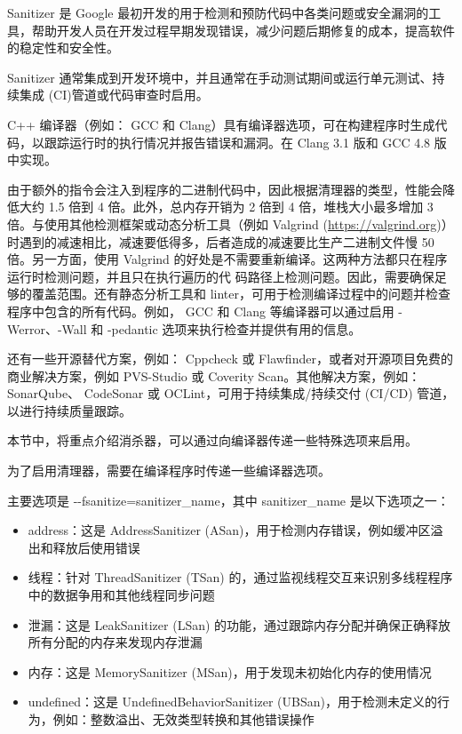 
Sanitizer 是 Google 最初开发的用于检测和预防代码中各类问题或安全漏洞的工具，帮助开发人员在开发过程早期发现错误，减少问题后期修复的成本，提高软件的稳定性和安全性。

Sanitizer 通常集成到开发环境中，并且通常在手动测试期间或运行单元测试、持续集成 (CI)管道或代码审查时启用。

C++ 编译器（例如： GCC 和 Clang）具有编译器选项，可在构建程序时生成代码，以跟踪运行时的执行情况并报告错误和漏洞。在 Clang 3.1 版和 GCC 4.8 版中实现。

由于额外的指令会注入到程序的二进制代码中，因此根据清理器的类型，性能会降低大约 1.5 倍到 4 倍。此外，总内存开销为 2 倍到 4 倍，堆栈大小最多增加 3 倍。与使用其他检测框架或动态分析工具（例如 Valgrind (\url{https://valgrind.org})）时遇到的减速相比，减速要低得多，后者造成的减速要比生产二进制文件慢 50 倍。另一方面，使用 Valgrind 的好处是不需要重新编译。这两种方法都只在程序运行时检测问题，并且只在执行遍历的代
码路径上检测问题。因此，需要确保足够的覆盖范围。还有静态分析工具和 linter，可用于检测编译过程中的问题并检查程序中包含的所有代码。例如， GCC 和 Clang 等编译器可以通过启用 -Werror、-Wall 和 -pedantic 选项来执行检查并提供有用的信息。

还有一些开源替代方案，例如： Cppcheck 或 Flawfinder，或者对开源项目免费的商业解决方案，例如 PVS-Studio 或 Coverity Scan。其他解决方案，例如： SonarQube、 CodeSonar 或 OCLint，可用于持续集成/持续交付 (CI/CD) 管道，以进行持续质量跟踪。

本节中，将重点介绍消杀器，可以通过向编译器传递一些特殊选项来启用。


为了启用清理器，需要在编译程序时传递一些编译器选项。

主要选项是 -{}-fsanitize=sanitizer\_name，其中 sanitizer\_name 是以下选项之一：

\begin{itemize}
\item
address：这是 AddressSanitizer (ASan)，用于检测内存错误，例如缓冲区溢出和释放后使用错误

\item
线程：针对 ThreadSanitizer (TSan) 的，通过监视线程交互来识别多线程程序中的数据争用和其他线程同步问题

\item
泄漏：这是 LeakSanitizer (LSan) 的功能，通过跟踪内存分配并确保正确释放所有分配的内存来发现内存泄漏

\item
内存：这是 MemorySanitizer (MSan)，用于发现未初始化内存的使用情况

\item
undefined：这是 UndefinedBehaviorSanitizer (UBSan)，用于检测未定义的行为，例如：整数溢出、无效类型转换和其他错误操作
\end{itemize}

